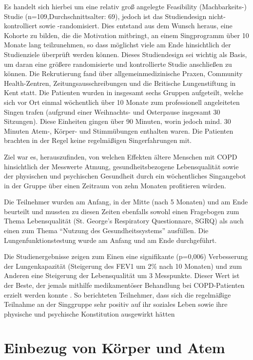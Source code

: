 Es handelt sich hierbei um eine relativ groß angelegte Feasibility (Machbarkeits-) Studie (n=109,Durchschnittsalter: 69), jedoch ist das Studiendesign nicht-kontrolliert sowie -randomisiert. Dies entstand aus dem Wunsch heraus, eine Kohorte zu bilden, die die Motivation mitbringt, an einem Singprogramm über 10 Monate lang teilzunehmen, so dass möglichst viele am Ende hinsichtlich der Studienziele überprüft werden können. Dieses Studiendesign sei wichtig als Basis, um daran eine größere randomisierte und kontrollierte Studie anschließen zu können. Die Rekrutierung fand über allgemeinmedizinische Praxen, Community Health-Zentren, Zeitungsausschreibungen und die Britische Lungenstiftung in Kent statt. Die Patienten wurden in insgesamt sechs Gruppen aufgeteilt, welche sich vor Ort einmal wöchentlich über 10 Monate zum professionell angeleiteten Singen trafen (aufgrund einer Weihnachts- und Osterpause insgesamt 30 Sitzungen). Diese Einheiten gingen über 90 Minuten, worin jedoch mind. 30 Minuten Atem-, Körper- und Stimmübungen enthalten waren. Die Patienten brachten in der Regel keine regelmäßigen Singerfahrungen mit.

Ziel war es, herauszufinden, von welchen Effekten ältere Menschen mit COPD hinsichtlich der Messwerte Atmung, gesundheitsbezogene Lebensqualität sowie der physischen und psychischen Gesundheit durch ein wöchentliches Singangebot in der Gruppe über einen Zeitraum von zehn Monaten profitieren würden. 

Die Teilnehmer wurden am Anfang, in der Mitte (nach 5 Monaten) und am Ende beurteilt und mussten zu diesen Zeiten ebenfalls sowohl einen Fragebogen zum Thema Lebensqualität (St. George's Respiratory Questionnare, SGRQ) als auch einen zum Thema "`Nutzung des Gesundheitssystems"' ausfüllen. Die Lungenfunktionstestung wurde am Anfang und am Ende durchgeführt. 

Die Studienergebnisse zeigen zum Einen eine signifikante (p=0,006) Verbesserung der Lungenkapazität (Steigerung des FEV1 um 2\% nach 10 Monaten) und zum Anderen eine Steigerung der Lebensqualität um 3 Messpunkte. Dieser Wert ist der Beste, der jemals mithilfe medikamentöser Behandlung bei COPD-Patienten erzielt werden konnte \autocite[vgl.]{clift2013a}. So berichteten Teilnehmer, dass sich die regelmäßige Teilnahme an der Singgruppe sehr positiv auf ihr soziales Leben sowie ihre physische und psychische Konstitution ausgewirkt hätten \autocite[vgl.][6ff.]{clift2013}

\section{Einbezug von Körper und Atem} 
\label{section:einbezug von koerper und atem}

